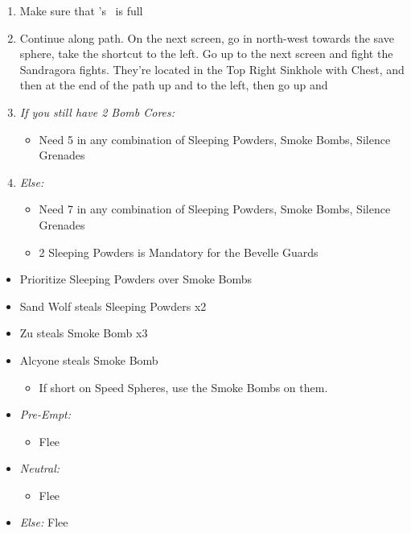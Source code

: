 \begin{enumerate}[resume]
	\item Make sure that \rikku's \od\ is full
	\item Continue along path. On the next screen, go in north-west towards the save sphere, take the shortcut to the left. Go up to the next screen and fight the Sandragora fights. They're located in the Top Right Sinkhole with Chest, and then at the end of the path up and to the left, then go up and \sd
	\item \textit{If you still have 2 Bomb Cores:}
	      \begin{itemize}
		      \item Need 5 in any combination of Sleeping Powders, Smoke Bombs, Silence Grenades
	      \end{itemize}
	\item \textit{Else:}
	      \begin{itemize}
		      \item Need 7 in any combination of Sleeping Powders, Smoke Bombs, Silence Grenades
		      \item 2 Sleeping Powders is Mandatory for the Bevelle Guards
	      \end{itemize}
\end{enumerate}
\winvfill
\begin{encounters}
	\begin{itemize}
		\item Prioritize Sleeping Powders over Smoke Bombs
		\item Sand Wolf steals Sleeping Powders x2
		\item Zu steals Smoke Bomb x3
		\item Alcyone steals Smoke Bomb
		      \begin{itemize}
			      \item If short on Speed Spheres, use the Smoke Bombs on them.
		      \end{itemize}
		\item \textit{Pre-Empt:}
		      \begin{itemize}
			      \tidusf Defend
			      \rikkuf Steal
			      \auronf Defend
			      \item Flee
		      \end{itemize}
		\item \textit{Neutral:}
		      \begin{itemize}
			      \switch{\tidus}{\kimahri}
			      \kimahrif Steal
			      \switch{\rikku}{\tidus}
			      \item Flee
		      \end{itemize}
		\item \textit{Else:} Flee
	\end{itemize}
\end{encounters}
